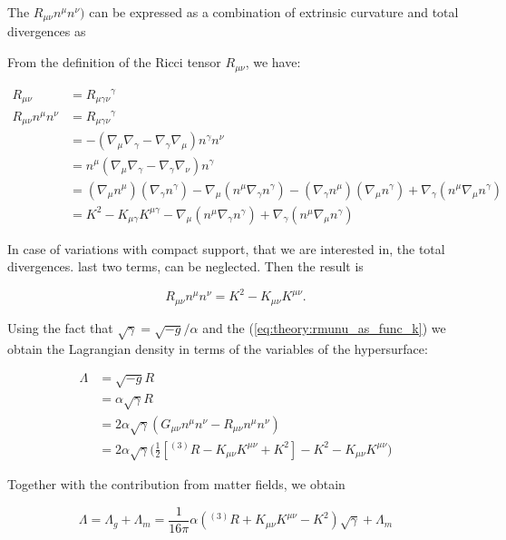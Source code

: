 \documentclass[11pt,a4paper,headinclude=true,DIV=14,BCOR=8mm,chapterprefix,listof=totoc,twoside,openright,abstracton]{scrbook}
\begin{document}
The $R_{\mu\nu}n^{\mu}n^{\nu})$ can be expressed as a combination of extrinsic curvature and total divergences as 

From the definition of the Ricci tensor $R_{\mu\nu}$, we have:

\begin{align}
    R_{\mu\nu} &= {R_{\mu\gamma\nu}}^{\gamma} \\
    R_{\mu\nu}n^{\mu}n^{\nu} &= {R_{\mu\gamma\nu}}^{\gamma} \\
    &= -(\nabla_{\mu}\nabla_{\gamma} - \nabla_{\gamma}\nabla_{\mu})n^{\gamma}n^{\nu} \\
    &= n^{\mu}(\nabla_{\mu}\nabla_{\gamma} - \nabla_{\gamma}\nabla_{\nu})n^{\gamma} \\
    &= (\nabla_{\mu}n^{\mu})(\nabla_{\gamma}n^{\gamma}) - \nabla_{\mu}(n^{\mu}\nabla_{\gamma}n^{\gamma}) - (\nabla_{\gamma}n^{\mu})(\nabla_{\mu}n^{\gamma}) + \nabla_{\gamma}(n^{\mu}\nabla_{\mu}n^{\gamma}) \\
    &= K^2 - K_{\mu\gamma}K^{\mu\gamma} - \nabla_{\mu}(n^{\mu}\nabla_{\gamma}n^{\gamma}) + \nabla_{\gamma}(n^{\mu}\nabla_{\mu}n^{\gamma})
\end{align}

In case of variations with compact support, that we are interested in, the total divergences. last two terms, can be neglected. Then the result is

\begin{equation}
    R_{\mu\nu}n^{\mu}n^{\nu}= K^2 - K_{\mu\nu}K^{\mu\nu}.
    \label{eq:theory:rmunu_as_func_k}
\end{equation}

Using the fact that $\sqrt{\gamma}=\sqrt{-g}/\alpha$ and the (\ref{eq:theory:rmunu_as_func_k}) we obtain the Lagrangian density in terms of the variables of the hypersurface:

\begin{align}
    \Lambda &= \sqrt{-g}R \\
    &= \alpha\sqrt{\gamma}R \\
    &= 2\alpha\sqrt{\gamma}(G_{\mu\nu}n^{\mu}n^{\nu} - R_{\mu\nu}n^{\mu}n^{\nu})\\ 
    &= 2\alpha\sqrt{\gamma}\Big(\frac{1}{2}[{^{(3)}R} - K_{\mu\nu}K^{\mu\nu} + K^2] - K^2 - K_{\mu\nu}K^{\mu\nu}\Big)
\end{align}

Together with the contribution from matter fields, we obtain

\begin{equation}
    \Lambda = \Lambda_g+\Lambda_m= \frac{1}{16\pi}\alpha({^{(3)}R} + K_{\mu\nu}K^{\mu\nu} - K^2)\sqrt{\gamma}+\Lambda_m
\end{equation}
\end{document}
